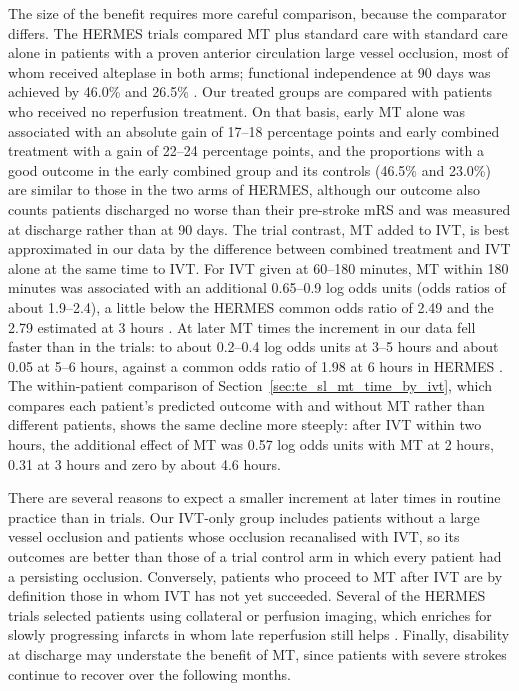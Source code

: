 The size of the benefit requires more careful comparison, because the comparator differs. The HERMES trials compared MT plus standard care with standard care alone in patients with a proven anterior circulation large vessel occlusion, most of whom received alteplase in both arms; functional independence at 90 days was achieved by 46.0\% and 26.5\% . Our treated groups are compared with patients who received no reperfusion treatment. On that basis, early MT alone was associated with an absolute gain of 17--18 percentage points and early combined treatment with a gain of 22--24 percentage points, and the proportions with a good outcome in the early combined group and its controls (46.5\% and 23.0\%) are similar to those in the two arms of HERMES, although our outcome also counts patients discharged no worse than their pre-stroke mRS and was measured at discharge rather than at 90 days. The trial contrast, MT added to IVT, is best approximated in our data by the difference between combined treatment and IVT alone at the same time to IVT. For IVT given at 60--180 minutes, MT within 180 minutes was associated with an additional 0.65--0.9 log odds units (odds ratios of about 1.9--2.4), a little below the HERMES common odds ratio of 2.49  and the 2.79 estimated at 3 hours . At later MT times the increment in our data fell faster than in the trials: to about 0.2--0.4 log odds units at 3--5 hours and about 0.05 at 5--6 hours, against a common odds ratio of 1.98 at 6 hours in HERMES . The within-patient comparison of Section~\ref{sec:te_sl_mt_time_by_ivt}, which compares each patient's predicted outcome with and without MT rather than different patients, shows the same decline more steeply: after IVT within two hours, the additional effect of MT was 0.57 log odds units with MT at 2 hours, 0.31 at 3 hours and zero by about 4.6 hours.

There are several reasons to expect a smaller increment at later times in routine practice than in trials. Our IVT-only group includes patients without a large vessel occlusion and patients whose occlusion recanalised with IVT, so its outcomes are better than those of a trial control arm in which every patient had a persisting occlusion. Conversely, patients who proceed to MT after IVT are by definition those in whom IVT has not yet succeeded. Several of the HERMES trials selected patients using collateral or perfusion imaging, which enriches for slowly progressing infarcts in whom late reperfusion still helps . Finally, disability at discharge may understate the benefit of MT, since patients with severe strokes continue to recover over the following months.

